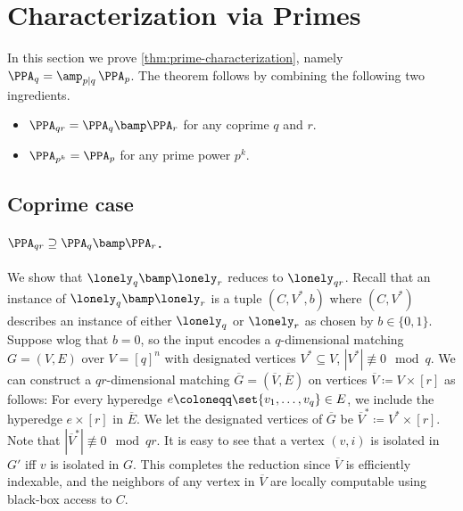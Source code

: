 \setcounter{section}{2}
\setcounter{theorem}{10}
\section{Characterization via Primes} \label{sec:characterization}

In this section we prove \autoref{thm:prime-characterization}, namely $\PPA_q = \amp_{p|q}\, \PPA_p$. The theorem follows by combining the following two ingredients.
\begin{itemize}[leftmargin=1.5cm,itemsep=3pt]
\item[\secref{sec:coprime}:]
$\PPA_{q r} = \PPA_q\bamp\PPA_r$ for any coprime $q$ and $r$.
\item[\secref{sec:prime-power}:]
$\PPA_{p^k} = \PPA_p$ for any prime power $p^k$.
\end{itemize}

\subsection{Coprime case} \label{sec:coprime}
\paragraph{\boldmath$\PPA_{qr} \supseteq \PPA_q \bamp\PPA_r$.}
We show that $\lonely_q \bamp\lonely_r$ reduces to $\lonely_{qr}$. Recall that an instance of $\lonely_q \bamp\lonely_r$ is a tuple $(C,V^*, b)$ where $(C,V^*)$ describes an instance of either $\lonely_q$ or $\lonely_r$ as chosen by $b\in\{0,1\}$. Suppose wlog that $b=0$, so the input encodes a $q$-dimensional matching $G = (V,E)$ over $V = [q]^n$ with designated vertices $V^*\subseteq V$, $|V^*| \not\equiv 0 \mod{q}$. We can construct a $qr$-dimensional matching $\overline{G} = (\overline{V},\overline{E})$ on vertices $\overline{V}\coloneqq V \times [r]$ as follows: For every hyperedge $e \coloneqq \set{v_1, \ldots, v_q} \in E$, we include the hyperedge $e \times [r]$ in $\overline{E}$. We let the designated vertices of $\overline{G}$ be $\overline{V}^* \coloneqq V^* \times [r]$. Note that $|\overline{V}^*| \not\equiv 0 \mod{qr}$. It is easy to see that a vertex $(v,i)$ is isolated in $G'$ iff $v$ is isolated in $G$. This completes the reduction since $\overline{V}$ is efficiently indexable, and the neighbors of any vertex in $\overline{V}$ are locally computable using black-box access to $C$. 

